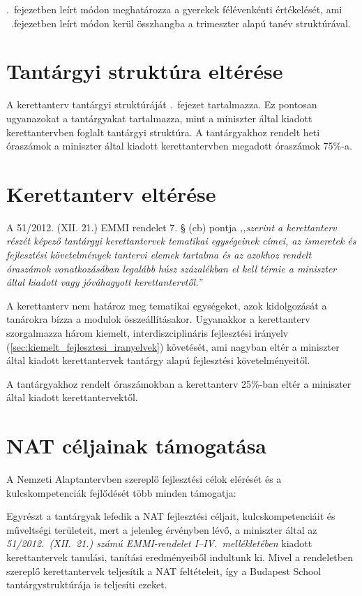 .~fejezetben leírt módon meghatározza a gyerekek félévenkénti értékelését, ami ~.fejezetben leírt módon kerül összhangba a trimeszter alapú tanév struktúrával.

\section{Tantárgyi struktúra eltérése} 
A kerettanterv tantárgyi struktúráját .~fejezet tartalmazza. Ez pontosan ugyanazokat a tantárgyakat tartalmazza, mint a miniszter által kiadott kerettantervben foglalt tantárgyi struktúra. A tantárgyakhoz rendelt heti óraszámok a miniszter által kiadott kerettantervben megadott óraszámok 75\%-a.

\section{Kerettanterv eltérése}
A 51/2012. (XII. 21.) EMMI rendelet 7. § (cb) pontja \emph{,,szerint a kerettanterv részét képező tantárgyi kerettantervek tematikai egységeinek címei, az ismeretek és fejlesztési követelmények tantervi elemek tartalma és az azokhoz rendelt óraszámok vonatkozásában legalább húsz százalékban el kell térnie a miniszter által kiadott vagy jóváhagyott kerettantervtől.''}

A kerettanterv nem határoz meg tematikai egységeket, azok kidolgozását a tanárokra bízza a modulok összeállításakor. Ugyanakkor a kerettanterv szorgalmazza három kiemelt, interdiszciplináris fejlesztési irányelv (\ref{sec:kiemelt_fejlesztesi_iranyelvek}) követését, ami nagyban eltér a miniszter által kiadott kerettantervek tantárgy alapú fejlesztési követelményeitől. 

A tantárgyakhoz rendelt óraszámokban a kerettanterv  25\%-ban eltér a miniszter által kiadott kerettantervektől.

\section{NAT céljainak támogatása}
\label{sec:nat_celjai}
A Nemzeti Alaptantervben szereplő fejlesztési célok elérését és a
kulcskompetenciák fejlődését több minden támogatja:

Egyrészt a tantárgyak lefedik a NAT fejlesztési céljait, kulcskompetenciáit és
műveltségi területeit, mert a jelenleg érvényben lévő, a miniszter által az
\emph{51/2012.~(XII.~21.) számú EMMI-rendelet I--IV.~mellékletében} kiadott
kerettantervek \citep{ofi:kerettanterv} tanulási, tanítási eredményeiből
indultunk ki. Mivel a rendeletben szereplő kerettantervek teljesítik a NAT
feltételeit, így a Budapest School tantárgystruktúrája is teljesíti ezeket.

